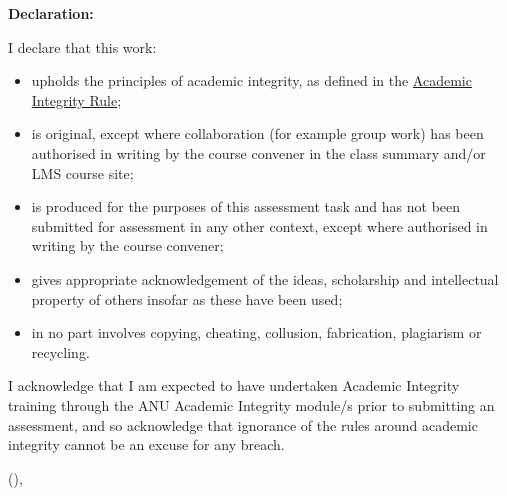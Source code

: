   \ifLongThesisStyle
{\sffamily\bfseries\Large Declaration:}\\
\fi



I declare that this work:
\begin{itemize}
  \item upholds the principles of academic integrity, as defined in the \href{https://www.legislation.gov.au/Details/F2021L00997}{Academic Integrity Rule};
  \item is original, except where collaboration (for example group work) has been authorised in writing by the course convener in the class summary and/or LMS course site;
  \item is produced for the purposes of this assessment task and has not been submitted for assessment in any other context, except where authorised in writing by the course convener;
  \item gives appropriate acknowledgement of the ideas, scholarship and intellectual property of others insofar as these have been used;
  \item in no part involves copying, cheating, collusion, fabrication, plagiarism or recycling.
\end{itemize}

I acknowledge that I am expected to have undertaken Academic Integrity training through the ANU Academic Integrity module/s prior to submitting an assessment, and so acknowledge that ignorance of the rules around academic integrity cannot be an excuse for any breach.

\vspace{.25 cm}
{\parfillskip=0pt\hfill \monthname{} (\the\year), \AuthorName\par}